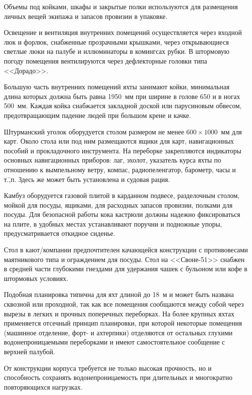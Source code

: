 \documentclass[a4paper, 12pt, twoside, final, book, russian, fittopage, cyremdash]{ncc}
\begin{document}
Объемы под койками, шкафы и закрытые полки используются для размещения личных вещей экипажа и запасов провизии в упаковке.

Освещение и вентиляция внутренних помещений осуществляется через входной люк и форлюк, снабженные прозрачными крышками, через открывающиеся светлые люки на палубе и иллюминаторы в комингсах рубки. В штормовую погоду помещения вентилируются через дефлекторные головки типа <<Дорадо>>.

Большую часть внутренних помещений яхты занимают койки, минимальная длина которых должна быть равна 1950~мм при ширине в голове 650 и в ногах 500~мм. Каждая койка снабжается закладной доской или парусиновым обвесом, предотвращающим падение людей при большом крене и качке.

Штурманский уголок оборудуется столом размером не менее $600 \times 1000$~мм для карт. Около стола или под ним размещаются ящики для карт, навигационных пособий и прокладочного инструмента. На переборке закрепляются индикаторы основных навигационных приборов: лаг, эхолот, указатель курса яхты по отношению к вымпельному ветру, компас, радиопеленгатор, барометр, часы и т.\=,п. Здесь же может быть установлена и судовая рация.

Камбуз оборудуется газовой плитой в карданном подвесе, разделочным столом, мойкой для посуды, ящиками, для расходных запасов провизии, полками для посуды. Для безопасной работы кока кастрюли должны надежно фиксироваться на плите, в удобных местах устанавливают поручни и подножные упоры, предусматривается откидное сиденье. 

Стол в кают\-/компании предпочтителен качающейся конструкции с противовесами маятникового типа и ограждением для посуды. Стол на <<Своне-51>> снабжен в средней части глубокими гнездами для удержания чашек с бульоном или кофе в штормовых условиях.

Подобная планировка типична для яхт длиной до 18~м и может быть названа сквозной или проходной, так как все помещения сообщаются между собой через вырезы в легких и прочных поперечных переборках. На более крупных яхтах применяется отсечный принцип планировки, при которой некоторые помещения (машинное отделение, форт- и ахтерпики) отделяются от остальных глухими водонепроницаемыми переборками и имеют самостоятельное сообщение с верхней палубой. 

От конструкции корпуса требуется не только высокая прочность, но и способность сохранять водонепроницаемость при длительных и многократно повторяющихся нагрузках.
\end{document}
